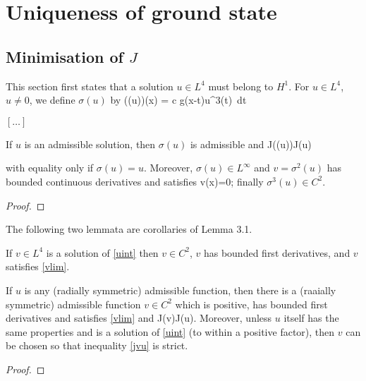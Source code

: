 \newcommand{\intrrr}{\int_{\R^3}}
\chapter{Uniqueness of ground state}




\section{Minimisation of $J$}
This section first states that a solution $u\in L^4$ must belong to $H^1$.
For $u\in L^4$, $u\neq 0$, we define $\sigma(u)$ by 
\be \label{sigmadef} \left(\sigma(u)\right)(x) = c \int g(x-t)u^3(t)~dt \ee

$[\ldots]$

\begin{lemma} 
If $u$ is an admissible solution, then $\sigma(u)$ is admissible and
\be\label{jsigma}
J(\sigma(u))\leq J(u)
\ee

with equality only if $\sigma(u) = u$. Moreover, $\sigma(u)\in L^\infty$ 
and $v=\sigma^2(u)$ has bounded continuous derivatives and satisfies
\be\label{vlim}
 v(x)=0;
\ee
finally $\sigma^3(u)\in C^2$.
\end{lemma}
\begin{proof}
\end{proof}

The following two lemmata are corollaries of Lemma 3.1.
\begin{lemma} 
    If $v\in L^4$ is a solution of \eqref{uint} then $v\in C^2$, $v$ has
    bounded first derivatives, and $v$ satisfies \eqref{vlim}.
\end{lemma}
\begin{lemma} 
    If $u$ is any (radially symmetric) admissible function, then there is a
    (raaially symmetric) admissible function $v\in C^2$ which is positive, has
    bounded first derivatives and satisfies \eqref{vlim} and 
\be\label{jvu}
J(v)\leq J(u).
\ee
    Moreover, unless $u$ itself has the same properties and is a solution of 
    \eqref{uint} (to within a positive factor), then $v$ can be chosen so that
    inequality \eqref{jvu} is strict.
\end{lemma}
\begin{proof}
\end{proof}

% 
% 

